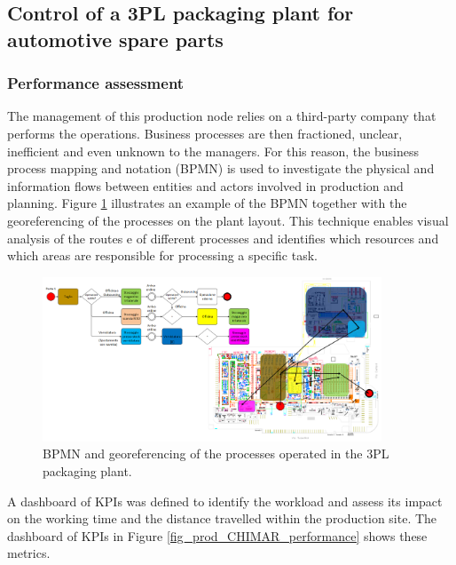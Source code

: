\subsection{Control of a 3PL packaging plant for automotive spare parts} \label{secControlPackagingPlant}
\subsubsection{Performance assessment}

The management of this production node relies on a third-party company that performs the operations. Business processes are then fractioned, unclear, inefficient and even unknown to the managers. For this reason, the business process mapping and notation (BPMN)  is used to investigate the physical and information flows between entities and actors involved in production and planning. Figure \ref{fig_prod_CHIMAR_bpmn} illustrates an example of the BPMN together with the georeferencing of the processes on the plant layout. This technique enables visual analysis of the routes e of different processes and identifies which resources and which areas are responsible for processing a specific task. 

\begin{figure}[hbt!]
\centering
\includegraphics[width=0.9\textwidth]{sectionProduction/control_figures/fig_prod_CHIMAR_bpmn.png}
\captionsetup{type=figure}
\caption{BPMN and georeferencing of the processes operated in the 3PL packaging plant.}
\label{fig_prod_CHIMAR_bpmn}
\end{figure}

A dashboard of KPIs was defined to identify the workload and assess its impact on the working time and the distance travelled within the production site. The dashboard of KPIs in Figure \ref{fig_prod_CHIMAR_performance} shows these metrics.

